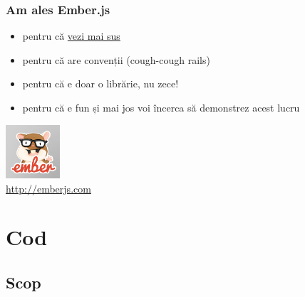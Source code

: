 \documentclass[compress]{beamer}
\begin{document}
\begin{frame}

\frametitle{Am ales Ember.js}

\begin{itemize}[<+->]
  \item pentru că \hyperlink{why}{vezi mai sus \MoveUp}
  \item pentru că are convenții (cough-cough rails)
  \item pentru că e doar o librărie, nu zece!
  \item pentru că e fun și mai jos voi încerca să demonstrez acest lucru
\end{itemize}

\begin{flushright}
  \includegraphics[width=2cm]{emberjs.png}
  \\
  \tiny \url{http://emberjs.com}
\end{flushright}

\end{frame}

\section{Cod}
\subsection{Scop}
\end{document}
